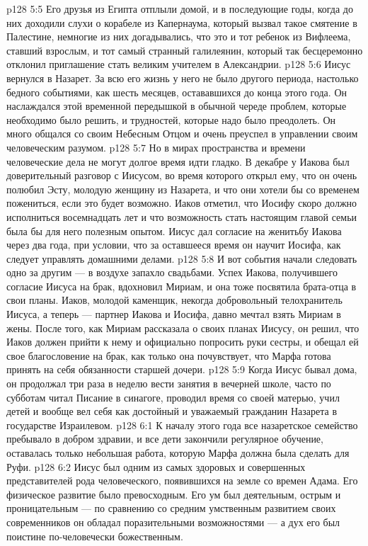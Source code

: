 \vs p128 5:5 Его друзья из Египта отплыли домой, и в последующие годы, когда до них доходили слухи о корабеле из Капернаума, который вызвал такое смятение в Палестине, немногие из них догадывались, что это и тот ребенок из Вифлеема, ставший взрослым, и тот самый странный галилеянин, который так бесцеремонно отклонил приглашение стать великим учителем в Александрии.
\vs p128 5:6 \pc Иисус вернулся в Назарет. За всю его жизнь у него не было другого периода, настолько бедного событиями, как шесть месяцев, остававшихся до конца этого года. Он наслаждался этой временной передышкой в обычной череде проблем, которые необходимо было решить, и трудностей, которые надо было преодолеть. Он много общался со своим Небесным Отцом и очень преуспел в управлении своим человеческим разумом.
\vs p128 5:7 Но в мирах пространства и времени человеческие дела не могут долгое время идти гладко. В декабре у Иакова был доверительный разговор с Иисусом, во время которого открыл ему, что он очень полюбил Эсту, молодую женщину из Назарета, и что они хотели бы со временем пожениться, если это будет возможно. Иаков отметил, что Иосифу скоро должно исполниться восемнадцать лет и что возможность стать настоящим главой семьи была бы для него полезным опытом. Иисус дал согласие на женитьбу Иакова через два года, при условии, что за оставшееся время он научит Иосифа, как следует управлять домашними делами.
\vs p128 5:8 И вот события начали следовать одно за другим --- в воздухе запахло свадьбами. Успех Иакова, получившего согласие Иисуса на брак, вдохновил Мириам, и она тоже посвятила брата\hyp{}отца в свои планы. Иаков, молодой каменщик, некогда добровольный телохранитель Иисуса, а теперь --- партнер Иакова и Иосифа, давно мечтал взять Мириам в жены. После того, как Мириам рассказала о своих планах Иисусу, он решил, что Иаков должен прийти к нему и официально попросить руки сестры, и обещал ей свое благословение на брак, как только она почувствует, что Марфа готова принять на себя обязанности старшей дочери.
\vs p128 5:9 \pc Когда Иисус бывал дома, он продолжал три раза в неделю вести занятия в вечерней школе, часто по субботам читал Писание в синагоге, проводил время со своей матерью, учил детей и вообще вел себя как достойный и уважаемый гражданин Назарета в государстве Израилевом.
\vs p128 6:1 К началу этого года все назаретское семейство пребывало в добром здравии, и все дети закончили регулярное обучение, оставалась только небольшая работа, которую Марфа должна была сделать для Руфи.
\vs p128 6:2 \pc Иисус был одним из самых здоровых и совершенных представителей рода человеческого, появившихся на земле со времен Адама. Его физическое развитие было превосходным. Его ум был деятельным, острым и проницательным --- по сравнению со средним умственным развитием своих современников он обладал поразительными возможностями --- а дух его был поистине по\hyp{}человечески божественным.
